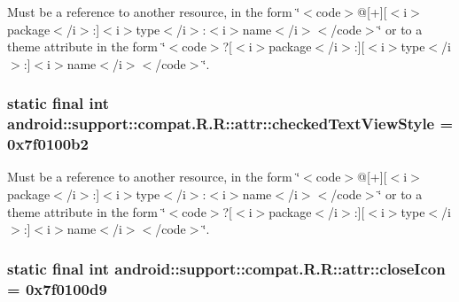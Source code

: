 Must be a reference to another resource, in the form \char`\"{}$<$code$>$@\mbox{[}+\mbox{]}\mbox{[}$<$i$>$package$<$/i$>$:\mbox{]}$<$i$>$type$<$/i$>$:$<$i$>$name$<$/i$>$$<$/code$>$\char`\"{} or to a theme attribute in the form \char`\"{}$<$code$>$?\mbox{[}$<$i$>$package$<$/i$>$:\mbox{]}\mbox{[}$<$i$>$type$<$/i$>$:\mbox{]}$<$i$>$name$<$/i$>$$<$/code$>$\char`\"{}. \hypertarget{classandroid_1_1support_1_1compat_1_1_r_1_1attr_0a93414559a98d2db60fa324f8181142}{
\subsubsection[{checkedTextViewStyle}]{\setlength{\rightskip}{0pt plus 5cm}static final int android::support::compat.R.R::attr::checkedTextViewStyle = 0x7f0100b2}}
\label{classandroid_1_1support_1_1compat_1_1_r_1_1attr_0a93414559a98d2db60fa324f8181142}


Must be a reference to another resource, in the form \char`\"{}$<$code$>$@\mbox{[}+\mbox{]}\mbox{[}$<$i$>$package$<$/i$>$:\mbox{]}$<$i$>$type$<$/i$>$:$<$i$>$name$<$/i$>$$<$/code$>$\char`\"{} or to a theme attribute in the form \char`\"{}$<$code$>$?\mbox{[}$<$i$>$package$<$/i$>$:\mbox{]}\mbox{[}$<$i$>$type$<$/i$>$:\mbox{]}$<$i$>$name$<$/i$>$$<$/code$>$\char`\"{}. \hypertarget{classandroid_1_1support_1_1compat_1_1_r_1_1attr_6ead2538112a5f4d248b00808d073e41}{
\subsubsection[{closeIcon}]{\setlength{\rightskip}{0pt plus 5cm}static final int android::support::compat.R.R::attr::closeIcon = 0x7f0100d9}}
\label{classandroid_1_1support_1_1compat_1_1_r_1_1attr_6ead2538112a5f4d248b00808d073e41}


